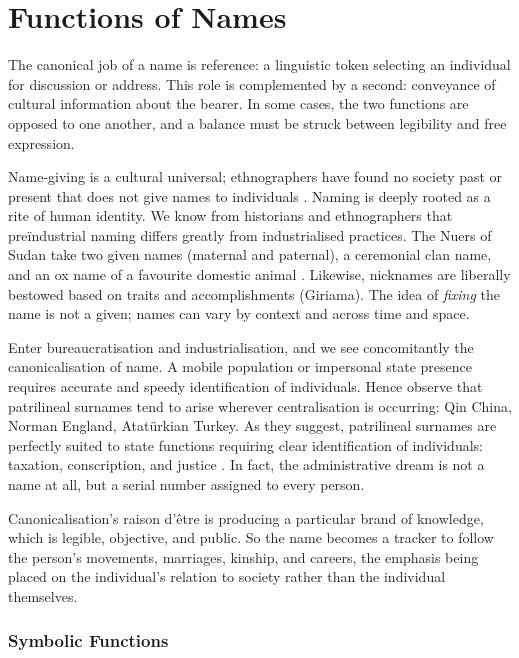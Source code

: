 \section{Functions of Names}

The canonical job of a name is reference: a linguistic token selecting an individual for discussion or address. This role is complemented by a second: conveyance of cultural information about the bearer. In some cases, the two functions are opposed to one another, and a balance must be struck between legibility and free expression.

Name-giving is a cultural universal; ethnographers have found no society past or present that does not give names to individuals \parencite{alford87}. Naming is deeply rooted as a rite of human identity. We know from historians and ethnographers that preïndustrial naming differs greatly from industrialised practices. The Nuers of Sudan take two given names (maternal and paternal), a ceremonial clan name, and an ox name of a favourite domestic animal \parencite{wardhaugh92}. Likewise, nicknames are liberally bestowed based on traits and accomplishments (Giriama). The idea of \textit{fixing} the name is not a given; names can vary by context and across time and space.

Enter bureaucratisation and industrialisation, and we see concomitantly the canonicalisation of name. A mobile population or impersonal state presence requires accurate and speedy identification of individuals. Hence \textcite{scott02} observe that patrilineal surnames tend to arise wherever centralisation is occurring: Qin China, Norman England, Atatürkian Turkey. As they suggest, patrilineal surnames are perfectly suited to state functions requiring clear identification of individuals: taxation, conscription, and justice \parencite[18]{scott02}. In fact, the administrative dream is not a name at all, but a serial number assigned to every person.

Canonicalisation's raison d'être is producing a particular brand of knowledge, which is legible, objective, and public. So the name becomes a tracker to follow the person's movements, marriages, kinship, and careers, the emphasis being placed on the individual's relation to society rather than the individual themselves.

\subsubsection{Symbolic Functions}

